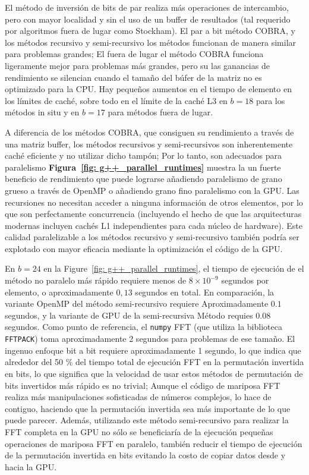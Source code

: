 ﻿\documentclass[10pt]{article}
\begin{document}
{{El método de inversión de bits de par realiza más operaciones de intercambio, pero con mayor localidad y sin el uso de un buffer de resultados (tal
requerido por algoritmos fuera de lugar como Stockham). El par a bit
método COBRA, y los métodos recursivo y semi-recursivo los métodos funcionan de manera similar para problemas grandes; El fuera de lugar el método COBRA funciona ligeramente mejor para problemas más grandes, pero su las ganancias de rendimiento se silencian cuando el tamaño del búfer de la matriz no es optimizado para la CPU. Hay pequeños aumentos en el tiempo de elemento en los límites de caché, sobre todo en el límite de la caché L3 en $b = 18$ para los métodos in situ y en $b = 17$ para métodos fuera de lugar.

A diferencia de los métodos COBRA, que consiguen su rendimiento a través de una matriz buffer, los métodos recursivos y semi-recursivos son inherentemente caché eficiente y no utilizar dicho tampón; Por lo tanto, son adecuados para paralelismo {\bf Figura~\ref{fig: g++_parallel_runtimes}} muestra la un fuerte beneficio de rendimiento que puede lograrse añadiendo paralelismo de grano grueso a través de OpenMP o añadiendo grano fino paralelismo con la GPU. Las recursiones no necesitan acceder a ninguna información de otros elementos, por lo que son perfectamente concurrencia (incluyendo el hecho de que las arquitecturas modernas incluyen cachés L1 independientes para cada núcleo de hardware). Este calidad paralelizable a los métodos recursivo y semi-recursivo también podría ser explotado con mayor eficacia mediante la optimización el código de la GPU.

En $b = 24$ en la Figure~\ref{fig: g++_parallel_runtimes}, el tiempo de ejecución de el método no paralelo más rápido requiere menos de $8 \times
{10} ^ {-9}$ segundos por elemento, o aproximadamente $0,13$ segundos en total. En comparación, la variante OpenMP del método semi-recursivo requiere
Aproximadamente $0.1$ segundos, y la variante de GPU de la semi-recursiva
Método requies $0.08$ segundos. Como punto de referencia, el {\tt numpy} FFT (que utiliza la biblioteca {\tt FFTPACK}) toma aproximadamente 2 segundos para problemas de ese tamaño. El ingenuo enfoque bit a bit requiere aproximadamente 1 segundo, lo que indica que alrededor del 50 \% del tiempo total de ejecución FFT en la permutación invertida en bits, lo que significa que la velocidad de usar estos métodos de permutación de bits invertidos más rápido es no trivial; Aunque el código de mariposa FFT realiza más manipulaciones sofisticadas de números complejos, lo hace de contiguo, haciendo que la permutación invertida sea más importante de lo que puede parecer. Además, utilizando este método semi-recursivo para realizar la FFT completa en la GPU no sólo se beneficiaría de la ejecución pequeñas operaciones de mariposa FFT en paralelo, también reducir el tiempo de ejecución de la permutación invertida en bits evitando la costo de copiar datos desde y hacia la GPU.

}}
\end{document}
